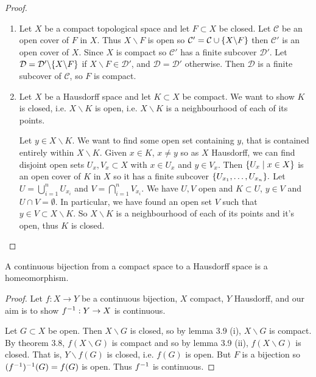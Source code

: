 \begin{proof}
    \begin{enumerate}
        \item Let $X$ be a compact topological space and let $F\subset X$ be closed. Let $\mathcal{C}$ be an open cover of $F$ in $X$. Thus $X\backslash F$ is open so $\mathcal{C}' = \mathcal{C} \cup \{X\backslash F\}$ then $\mathcal{C}'$ is an open cover of $X$. Since $X$ is compact so $\mathcal{C}'$ has a finite subcover $\mathcal{D}'$. Let $\mathcal{D} = \mathcal{D}'\backslash \{X\backslash F\}$ if $X\backslash F \in \mathcal{D}'$, and $\mathcal{D} = \mathcal{D}'$ otherwise. Then $\mathcal{D}$ is a finite subcover of $\mathcal{C}$, so $F$ is compact.
        
        \item Let $X$ be a Hausdorff space and let $K\subset X$ be compact. We want to show $K$ is closed, i.e. $X\backslash K$ is open, i.e. $X\backslash K$ is a neighbourhood of each of its points.
        
        Let $y\in X\backslash K$. We want to find some open set containing $y$, that is contained entirely within $X\backslash K$. Given $x\in K$, $x\neq y$ so as $X$ Hausdorff, we can find disjoint open sets $U_x, V_x\subset X$ with $x\in U_x$ and $y\in V_x$. Then $\{U_x\mid x\in X\}$ is an open cover of $K$ in $X$ so it has a finite subcover $\{U_{x_1}, \dots, U_{x_n}\}.$ 
        Let $U = \bigcup_{i=1}^n U_{x_i}$ and $V = \bigcap_{i=1}^n V_{x_i}$. We have $U,V$ open and $K\subset U$, $y\in V$ and $U\cap V = \emptyset$. In particular, we have found an open set $V$ such that $y\in V\subset X\backslash K$. So $X\backslash K$ is a neighbourhood of each of its points and it's open, thus $K$ is closed.
\end{enumerate}
\end{proof}

\begin{theorem}                     %
A continuous bijection from a compact space to a Hausdorff space is a homeomorphism.
\end{theorem}   

\begin{proof}
    Let $f: X\rightarrow Y$ be a continuous bijection, $X$ compact, $Y$ Hausdorff, and our aim is to show $f^{-1} : Y\rightarrow X$ is continuous.

    Let $G\subset X$ be open. Then $X\backslash G$ is closed, so by lemma 3.9 (i), $X\backslash G$ is compact. By theorem 3.8, $f(X\backslash G)$ is compact and so by lemma 3.9 (ii), $f(X\backslash G)$ is closed. That is, $Y\backslash f(G)$ is closed, i.e. $f(G)$ is open. But $F$ is a bijection so $(f^{-1})^{-1} (G) = f(G)$ is open. Thus $f^{-1}$ is continuous.
\end{proof}